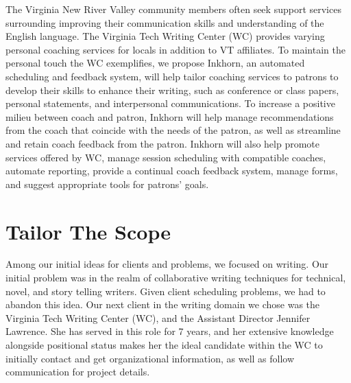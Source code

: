 \documentclass[12pt]{article} %
\begin{document}
  The Virginia New River Valley community members often seek support services surrounding improving their communication skills and understanding of the English language.
  The Virginia Tech Writing Center (WC) provides varying personal coaching services for locals in addition to VT affiliates.
  To maintain the personal touch the WC exemplifies, we propose Inkhorn, an automated scheduling and feedback system, will help tailor coaching services to patrons to develop their skills to enhance their writing, such as conference or class papers, personal statements, and interpersonal communications. 
  To increase a positive milieu between coach and patron, Inkhorn will help manage recommendations from the coach that coincide with the needs of the patron, as well as streamline and retain coach feedback from the patron.
  Inkhorn will also help promote services offered by WC, manage session scheduling with compatible coaches, automate reporting, provide a continual coach feedback system, manage forms, and suggest appropriate tools for patrons' goals.

\section{Tailor The Scope} %
  Among our initial ideas for clients and problems, we focused on writing.
  Our initial problem was in the realm of collaborative writing techniques for technical, novel, and story telling writers.
  Given client scheduling problems, we had to abandon this idea.
  Our next client in the writing domain we chose was the Virginia Tech Writing Center (WC), and the Assistant Director Jennifer Lawrence.
  She has served in this role for 7 years, and her extensive knowledge alongside positional status makes her the ideal candidate within the WC to initially contact and get organizational information, as well as follow communication for project details.
\end{document}
